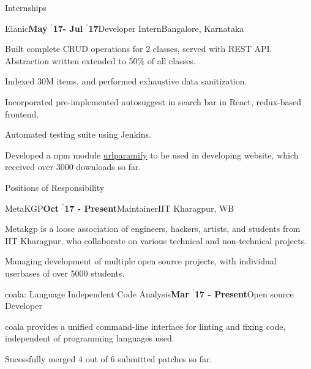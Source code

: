 \documentclass{resume} %
\begin{document}

\begin{rSection}{Internships}

\begin{rSubsection}{\large Elanic}{\textbf{\large May $^{\prime}$17- Jul $^{\prime}$17}}{Developer Intern}{Bangalore, Karnataka}
\item Built complete CRUD operations for 2 classes, served with REST API. Abstraction written extended to 50\% of all classes.
\item Indexed 30M items, and performed exhaustive data sanitization.
\item Incorporated pre-implemented autosuggest in search bar in React, redux-based frontend.
\item Automated testing suite using Jenkins.
\item Developed a npm module \href{https://www.npmjs.com/package/urlparamify}{urlparamify} to be used in developing website, which received over 3000 downloads so far.
\end{rSubsection}


\end{rSection}


\begin{rSection}{Positions of Responsibility}

\begin{rSubsection}{\large MetaKGP}{\textbf{\large Oct $^{\prime}$17 - Present}}{Maintainer}{IIT Kharagpur, WB}
\item Metakgp is a loose association of engineers, hackers, artists, and students from IIT Kharagpur, who collaborate on various technical and non-technical projects.
\item Managing development of multiple open source projects, with individual userbases of over 5000 students.
\end{rSubsection}

\begin{rSubsection}{\large coala: Language Independent Code Analysis}{\textbf{\large Mar $^{\prime}$17 - Present}}{Open source Developer}{}
\item coala provides a unified command-line interface for linting and fixing code, independent of programming languages used.
\item Sucessfully merged 4 out of 6 submitted patches so far.
\end{rSubsection}

\end{rSection}
\end{document}
